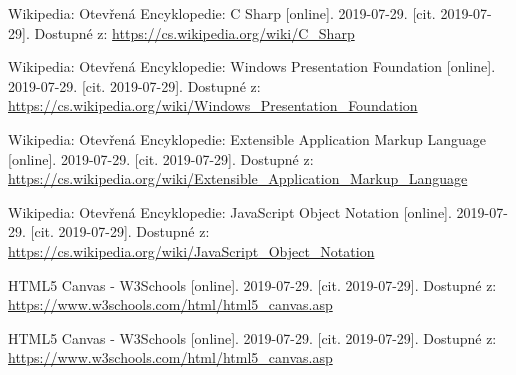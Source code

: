 \documentclass[
  field=inf,
  biblatex=false,
  glossaries,
  index
]{kidiplom}
\begin{document}
\begin{thebibliography}{9}
 Wikipedia: Otevřená Encyklopedie: C Sharp [online]. 2019-07-29. [cit. 2019-07-29]. Dostupné z: \url{https://cs.wikipedia.org/wiki/C\_Sharp}

 Wikipedia: Otevřená Encyklopedie: Windows Presentation Foundation [online]. 2019-07-29. [cit. 2019-07-29]. Dostupné z: \url{https://cs.wikipedia.org/wiki/Windows\_Presentation\_Foundation}

 Wikipedia: Otevřená Encyklopedie: Extensible Application Markup Language [online]. 2019-07-29. [cit. 2019-07-29]. Dostupné z: \url{https://cs.wikipedia.org/wiki/Extensible\_Application\_Markup\_Language}

 Wikipedia: Otevřená Encyklopedie: JavaScript Object Notation [online]. 2019-07-29. [cit. 2019-07-29]. Dostupné z: \url{https://cs.wikipedia.org/wiki/JavaScript\_Object\_Notation}

 HTML5 Canvas - W3Schools [online]. 2019-07-29. [cit. 2019-07-29]. Dostupné z: \url{https://www.w3schools.com/html/html5\_canvas.asp}

 HTML5 Canvas - W3Schools [online]. 2019-07-29. [cit. 2019-07-29]. Dostupné z: \url{https://www.w3schools.com/html/html5\_canvas.asp}

\end{thebibliography}
\printindex
\end{document}
